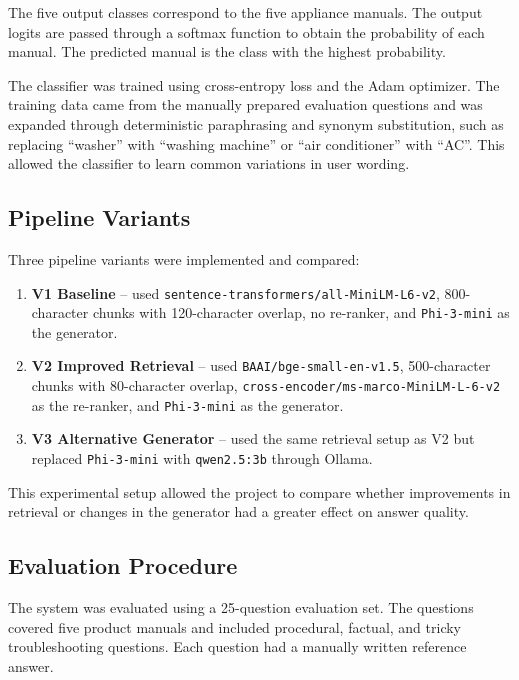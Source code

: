 The five output classes correspond to the five appliance manuals. The output logits are passed through a softmax function to obtain the probability of each manual. The predicted manual is the class with the highest probability.

The classifier was trained using cross-entropy loss and the Adam optimizer. The training data came from the manually prepared evaluation questions and was expanded through deterministic paraphrasing and synonym substitution, such as replacing ``washer'' with ``washing machine'' or ``air conditioner'' with ``AC''. This allowed the classifier to learn common variations in user wording.

\subsection{Pipeline Variants}

Three pipeline variants were implemented and compared:

\begin{enumerate}
    \item \textbf{V1 Baseline} -- used \texttt{sentence-transformers/all-MiniLM-L6-v2}, 800-character chunks with 120-character overlap, no re-ranker, and \texttt{Phi-3-mini} as the generator.
    
    \item \textbf{V2 Improved Retrieval} -- used \texttt{BAAI/bge-small-en-v1.5}, 500-character chunks with 80-character overlap, \texttt{cross-encoder/ms-marco-MiniLM-L-6-v2} as the re-ranker, and \texttt{Phi-3-mini} as the generator.
    
    \item \textbf{V3 Alternative Generator} -- used the same retrieval setup as V2 but replaced \texttt{Phi-3-mini} with \texttt{qwen2.5:3b} through Ollama.
\end{enumerate}

This experimental setup allowed the project to compare whether improvements in retrieval or changes in the generator had a greater effect on answer quality.

\subsection{Evaluation Procedure}

The system was evaluated using a 25-question evaluation set. The questions covered five product manuals and included procedural, factual, and tricky troubleshooting questions. Each question had a manually written reference answer.

